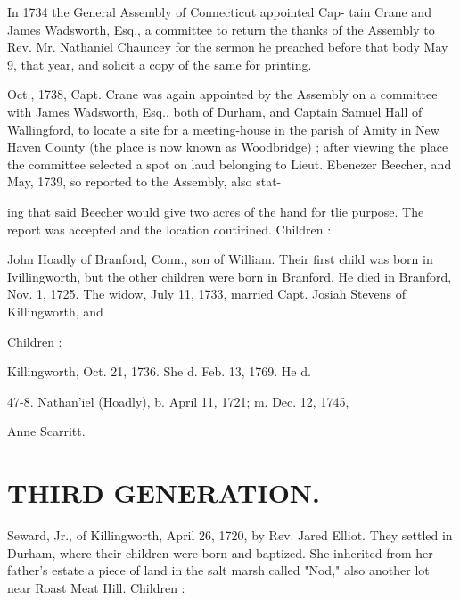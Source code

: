 \documentclass[oneside]{book}
\begin{document}
In 1734 the General Assembly of Connecticut appointed Cap- 
tain Crane and James Wadsworth, Esq., a committee to return 
the thanks of the Assembly to Rev. Mr. Nathaniel Chauncey for 
the sermon he preached before that body May 9, that year, and 
solicit a copy of the same for printing. 

Oct., 1738, Capt. Crane was again appointed by the Assembly 
on a committee with James Wadsworth, Esq., both of Durham, 
and Captain Samuel Hall of Wallingford, to locate a site for a 
meeting-house in the parish of Amity in New Haven County (the 
place is now known as Woodbridge) ; after viewing the place the 
committee selected a spot on laud belonging to Lieut. Ebenezer 
Beecher, and May, 1739, so reported to the Assembly, also stat- 




ing that said Beecher would give two acres of the hand for tlie 
purpose. The report was accepted and the location coutirined. 
Children : 





John Hoadly of Branford, Conn., son of William. Their first 
child was born in Ivillingworth, but the other children were born 
in Branford. He died in Branford, Nov. 1, 1725. The widow, 
July 11, 1733, married Capt. Josiah Stevens of Killingworth, and 

Children : 







Killingworth, Oct. 21, 1736. She d. Feb. 13, 1769. He d. 


47-8. Nathan'iel (Hoadly), b. April 11, 1721; m. Dec. 12, 1745, 

Anne Scarritt. 



\section{THIRD GENERATION.}


Seward, Jr., of Killingworth, April 26, 1720, by Rev. Jared 
Elliot. They settled in Durham, where their children were born 
and baptized. She inherited from her father's estate a piece of 
land in the salt marsh called "Nod," also another lot near Roast 
Meat Hill. Children : 
\end{document}
